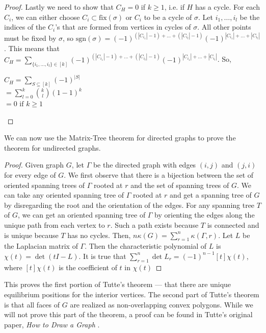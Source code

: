 \documentclass[11pt]{article}
\theoremstyle{definition}
\begin{document}
\begin{proof}
		Lastly we need to show that $C_H = 0$ if $k \geq 1$, i.e. if $H$ has a cycle. 
		For each $C_i$, we can either choose $C_i \subset \text{fix}(\sigma)$ or $C_i$ to be a cycle of $\sigma$. 
		Let $i_1, \dots, i_l$ be the indices of the $C_i$'s that are formed from vertices in cycles of $\sigma$. 
		All other points must be fixed by $\sigma$, so $\text{sgn}(\sigma) = (-1)^{(|C_{i_1}| -1) + \dots + (|C_{i_l}| -1)} (-1)^{|C_{i_1}| + \dots + |C_{i_l}|}$.
		This means that $C_H = \sum_{\{i_1, \dots, i_l\} \in [k]} (-1)^{(|C_{i_1}| -1) + \dots + (|C_{i_l}| -1)} (-1)^{|C_{i_1}| + \dots + |C_{i_l}|}$.
		So, 
		\begin{center}
			$C_H = \sum_{S \subseteq [k]}(-1)^{|S|}$ \\
			$ = \sum_{l=0}^{k} {k \choose l} (1-1)^k$ \\
			$ = 0 \text{ if } k \geq 1$
		\end{center}
	\end{proof}
	
	We can now use the Matrix-Tree theorem for directed graphs to prove the theorem for undirected graphs.
	
	\begin{proof}
		Given graph $G$, let $\Gamma$ be the directed graph with edges $(i,j)$ and $(j,i)$ for every edge of $G$. 
		We first observe that there is a bijection between the set of oriented spanning trees of $\Gamma$ rooted at $r$ and the set of spanning trees of $G$. 
		We can take any oriented spanning tree of $\Gamma$ rooted at $r$ and get a spanning tree of $G$ by disregarding the root and the orientation of the edges. 
		For any spanning tree $T$ of $G$, we can get an oriented spanning tree of $\Gamma$ by orienting the edges along the unique path from each vertex to $r$. 
		Such a path exists because $T$ is connected and is unique because $T$ has no cycles. 
		Then, $n \kappa(G) = \sum_{r=1}^{n} \kappa(\Gamma, r)$.
		Let $L$ be the Laplacian matrix of $\Gamma$.
		Then the characteristic polynomial of $L$ is $\chi(t) = \det(tI - L)$.
		It is true that $\sum_{r=1}^{n} \det L_r = (-1)^{n-1} [t]\chi(t)$, where $[t]\chi(t)$ is the coefficient of $t$ in $\chi(t)$
	\end{proof}
	
	This proves the first portion of Tutte's theorem --- that there are unique equilibrium positions for the interior vertices.
	The second part of Tutte's theorem is that all faces of $G$ are realized as non-overlapping convex polygons.
	While we will not prove this part of the theorem, a proof can be found in Tutte's original paper, \emph{How to Draw a Graph} \cite{tutte1963draw}.
	
\end{document}
